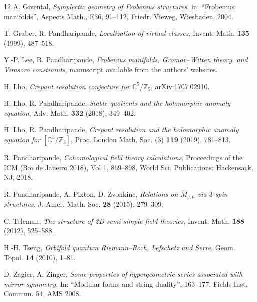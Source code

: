 \documentclass[12pt]{amsart}
\numberwithin{equation}{section}
\begin{document}
\begin{thebibliography}{12}
 A. Givental, {\em Symplectic geometry of Frobenius structures}, in: ``Frobenius manifolds'', Aspects Math., E36, 91--112, Friedr. Vieweg, Wiesbaden, 2004.

 T. Graber, R. Pandharipande, {\em Localization of virtual classes}, Invent. Math. {\bf 135} (1999), 487--518.


 Y.-P. Lee, R. Pandharipande, {\em Frobenius manifolds, Gromov--Witten theory, and Virasoro constraints}, manuscript available from the authors' websites.

 H. Lho, {\em Crepant resolution conjecture for $\mathbb{C}^5/\mathbb{Z}_5$}, arXiv:1707.02910. 



 H. Lho, R. Pandharipande, {\em Stable quotients and the holomorphic anomaly equation}, Adv. Math. {\bf 332} (2018), 349--402. 

 H. Lho, R. Pandharipande, {\em Crepant resolution and the holomorphic anomaly equation for $[\mathbb{C}^3/\mathbb{Z}_3]$}, Proc. London Math. Soc. (3) {\bf 119} (2019), 781--813.

 R. Pandharipande, {\em Cohomological field theory calculations}, Proceedings of the ICM (Rio de Janeiro 2018), Vol 1, 869--898, World Sci. Publications: Hackensack, NJ, 2018.

 R. Pandharipande, A. Pixton, D. Zvonkine, {\em Relations on $\overline{M}_{g,n}$ via $3$-spin structures}, J. Amer. Math. Soc. {\bf 28} (2015), 279--309.

 C. Teleman, {\em The structure of 2D semi-simple field theories}, Invent. Math. {\bf 188} (2012), 525--588.

 H.-H. Tseng, {\em Orbifold quantum Riemann--Roch, Lefschetz and Serre}, Geom. Topol. {\bf 14} (2010), 1--81. 

 D. Zagier, A. Zinger, {\em Some properties of hypergeometric series associated with mirror symmetry}, In: ``Modular forms and string duality'', 163--177, Fields Inst. Commun. 54, AMS 2008.
\end{thebibliography}
\end{document}
